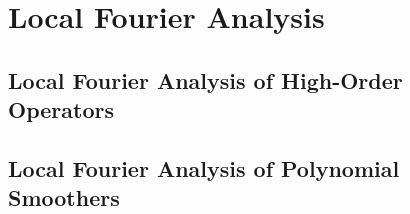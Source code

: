 \chapter{Local Fourier Analysis}\label{ch:LocalFourierAnalysis}


\section{Local Fourier Analysis of High-Order Operators}\label{sec:lfahighorder}


\section{Local Fourier Analysis of Polynomial Smoothers}\label{sec:lfasmoothers}

